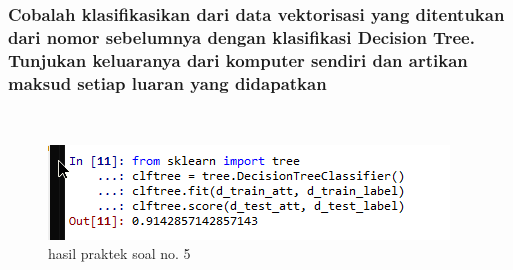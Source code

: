\subsubsection{Cobalah klasifikasikan dari data vektorisasi yang ditentukan dari nomor sebelumnya dengan klasifikasi Decision Tree. Tunjukan keluaranya dari komputer sendiri dan artikan maksud setiap luaran yang didapatkan}
\hfill\\

	\begin{figure}[H]
	\centering
		\includegraphics[width=8 cm]{figures/1174067/4/12.png}
	\caption{hasil praktek soal no. 5}
	\end{figure}

